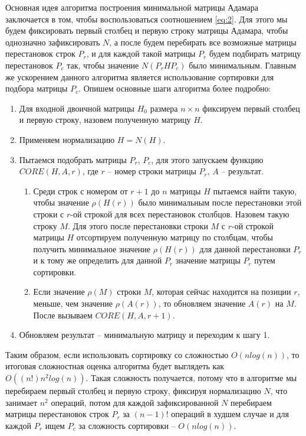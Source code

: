 \documentclass[a4paper, 14pt]{extreport}
\begin{document}
Основная идея алгоритма построения минимальной матрицы Адамара заключается в том, чтобы воспользоваться соотношением \ref{eq:2}. Для этого мы будем фиксировать первый столбец и первую строку матрицы Адамара, чтобы однозначно зафиксировать $N$, а после будем перебирать все возможные матрицы перестановок строк $P_r$, и для каждой такой матрицы $P_r$ будем подбирать матрицу перестановок $P_c$ так, чтобы значение $N(P_r H P_c)$ было минимальным. Главным же ускорением данного алгоритма является использование сортировки для подбора матрицы $P_c$. Опишем основные шаги алгоритма более подробно:
\begin{enumerate}
    \item Для входной двоичной матрицы $H_0$ размера $n \times n$ фиксируем первый столбец и первую строку, назовем полученную матрицу $H$.
    \item Применяем нормализацию $H = N(H)$.
    \item Пытаемся подобрать матрицы $P_r$, $P_c$, для этого запускаем функцию $CORE(H, A, r)$, где $r$ -- номер строки матрицы $P_r$, $A$ -- результат.
    \begin{enumerate}[label*=\arabic*.]
        \item Среди строк с номером от $r+1$ до $n$ матрицы $H$ пытаемся найти такую, чтобы значение $\rho(H(r))$ было минимальным после перестановки этой строки с $r$-ой строкой для всех перестановок столбцов. Назовем такую строку $M$. Для этого после перестановки строки $M$ с $r$-ой строкой матрицы $H$ отсортируем полученную матрицу по столбцам, чтобы получить минимальное значение $\rho(H(r))$ для данной перестановки $P_r$ и к тому же определить для данной $P_r$ значение матрицы $P_c$ путем сортировки.
        \item Если значение $\rho(M)$ строки $M$, которая сейчас находится на позиции $r$, меньше, чем значение $\rho(A(r))$, то обновляем значение $A(r)$ на $M$. После вызываем $CORE(H, A, r+1)$.
    \end{enumerate}
    \item Обновляем результат -- минимальную матрицу и переходим к шагу 1.
\end{enumerate}

Таким образом, если использовать сортировку со сложностью $O(nlog(n))$, то итоговая сложностная оценка алгоритма будет выглядеть как $O((n!)n^2log(n))$. Такая сложность получается, потому что в алгоритме мы перебираем первый столбец и первую строку, фиксируя нормализацию $N$, что занимает $n^2$ операций, потом для каждой зафиксированной $N$ перебираем матрицы перестановок строк $P_r$ за $(n-1)!$ операций в худшем случае и для каждой $P_r$ ищем $P_c$ за сложность сортировки -- $O(nlog(n))$.
\end{document}
